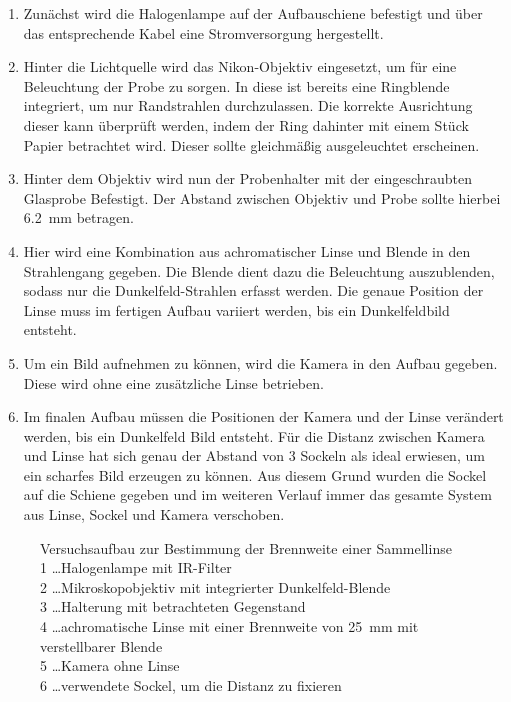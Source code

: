 \documentclass[12pt,english,ngerman]{scrartcl}
\begin{document}
\begin{enumerate}
	\item Zunächst wird die Halogenlampe auf der Aufbauschiene befestigt und über das
	      entsprechende Kabel eine Stromversorgung hergestellt.
	\item Hinter die Lichtquelle wird das Nikon-Objektiv eingesetzt, um für eine
	      Beleuchtung der Probe zu sorgen. In diese ist bereits eine Ringblende
	      integriert, um nur Randstrahlen durchzulassen. Die korrekte Ausrichtung dieser
	      kann überprüft werden, indem der Ring dahinter mit einem Stück Papier
	      betrachtet wird. Dieser sollte gleichmäßig ausgeleuchtet erscheinen.
	\item Hinter dem Objektiv wird nun der Probenhalter mit der eingeschraubten Glasprobe
	      Befestigt. Der Abstand zwischen Objektiv und Probe sollte hierbei
	      \SI{6.2}{\milli\meter} betragen.
	\item Hier wird eine Kombination aus achromatischer Linse und Blende in den
	      Strahlengang gegeben. Die Blende dient dazu die Beleuchtung auszublenden,
	      sodass nur die Dunkelfeld-Strahlen erfasst werden. Die genaue Position der
	      Linse muss im fertigen Aufbau variiert werden, bis ein Dunkelfeldbild entsteht.
	\item Um ein Bild aufnehmen zu können, wird die Kamera in den Aufbau gegeben. Diese
	      wird ohne eine zusätzliche Linse betrieben.
	\item Im finalen Aufbau müssen die Positionen der Kamera und der Linse verändert
	      werden, bis ein Dunkelfeld Bild entsteht. Für die Distanz zwischen Kamera und
	      Linse hat sich genau der Abstand von 3 Sockeln als ideal erwiesen, um ein
	      scharfes Bild erzeugen zu können. Aus diesem Grund wurden die Sockel auf die
	      Schiene gegeben und im weiteren Verlauf immer das gesamte System aus Linse,
	      Sockel und Kamera verschoben.
\end{enumerate}

\begin{figure}[H]
	\begin{center}
	\end{center}
	\caption[Versuchsaufbau zur Bestimmung der Brennweite einer Sammellinse] {
		Versuchsaufbau zur Bestimmung der Brennweite einer Sammellinse \\
		1 \dots Halogenlampe mit IR-Filter                             \\
		2 \dots Mikroskopobjektiv mit integrierter Dunkelfeld-Blende   \\
		3 \dots Halterung mit betrachteten Gegenstand                  \\
		4 \dots achromatische Linse mit einer Brennweite von \SI{25}{\milli\meter} mit
		verstellbarer Blende                                           \\
		5 \dots Kamera ohne Linse                                      \\
		6 \dots verwendete Sockel, um die Distanz zu fixieren
	}\label{fig:aufbau_dunkelfeldmikroskopie}
\end{figure}
\end{document}
